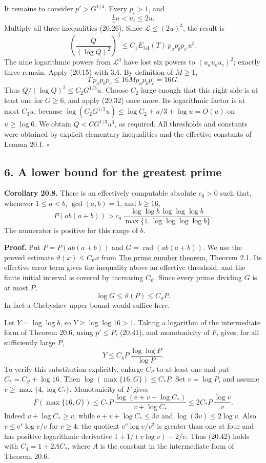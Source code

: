 \documentclass[
  11pt,
  a4paper,
]{article}
\begin{document}
It remains to consider \(p'>G^{1/4}\). Every \(p_i>1\), and \[
 \tfrac14u<u_i\le2u.
 \tag{20.37}
\] Multiply all three inequalities (20.26). Since
\(\mathcal L\le(2u)^3\), the result is \[
 \left(\frac Q{(\log Q)^2}\right)^3
 \le C_1 E_{3A}(T)\,p_ap_bp_c\,u^3.
 \tag{20.38}
\] The nine logarithmic powers from \(\mathcal L^3\) have lost six
powers to \((u_au_bu_c)^2\); exactly three remain. Apply (20.15) with
\(3A\). By definition of \(M\ge1\), \[
 T\,p_ap_bp_c
 \le16M p_ap_bp_c=16G.
 \tag{20.39}
\] Thus \(Q/(\log Q)^2\le C_2G^{1/3}u\). Choose \(C_2\) large enough
that this right side is at least one for \(G\ge6\), and apply (20.32)
once more. Its logarithmic factor is at most \(C_3u\), because
\(\log(C_2G^{1/3}u)\le\log C_2+u/3+\log u=O(u)\) on \(u\ge\log6\). We
obtain \(Q<C G^{1/3}u^3\), as required. All thresholds and constants
were obtained by explicit elementary inequalities and the effective
constants of Lemma 20.1. \(\square\)

\subsection{6. A lower bound for the greatest
prime}\label{a-lower-bound-for-the-greatest-prime}

\textbf{Corollary 20.8.} There is an effectively computable absolute
\(c_0>0\) such that, whenever \(1\le a<b\), \(\gcd(a,b)=1\), and
\(b\ge16\), \[
 P(ab(a+b))>
 c_0\,\frac{\log\log b\,\log\log\log b}
                 {\max\{1,\log\log\log\log b\}}.
 \tag{20.40}
\] The numerator is positive for this range of \(b\).

\textbf{Proof.} Put \(P=P(ab(a+b))\) and
\(G=\operatorname{rad}(ab(a+b))\). We use the proved estimate
\(\vartheta(x)\le C_\vartheta x\) from
\href{https://kokunoyumeto.github.io/open-math-courses-public/courses/NT-ZETA/NT-ZETA-12.html}{The prime number theorem}, Theorem
2.1. Its effective error term gives the inequality above an effective
threshold, and the finite initial interval is covered by increasing
\(C_\vartheta\). Since every prime dividing \(G\) is at most \(P\), \[
 \log G\le\vartheta(P)\le C_\vartheta P.
 \tag{20.41}
\] In fact a Chebyshev upper bound would suffice here.

Let \(Y=\log\log b\), so \(Y\ge\log\log16>1\). Taking a logarithm of the
intermediate form of Theorem 20.6, using \(p'\le P\), (20.41), and
monotonicity of \(F\), gives, for all sufficiently large \(P\), \[
 Y\le C_4 P\,\frac{\log\log P}{\log P}.
 \tag{20.42}
\] To verify this substitution explicitly, enlarge \(C_\vartheta\) to at
least one and put \(C_* = C_\vartheta+\log16\). Then
\(\log(\max\{16,G\})\le C_*P\). Set \(v=\log P\), and assume
\(v\ge\max\{4,\log C_*\}\). Monotonicity of \(F\) gives \[
 F(\max\{16,G\})\le
 C_*P\,\frac{\log(\mathrm e+v+\log C_*)}{v+\log C_*}
 \le 2C_*P\,\frac{\log v}{v}.
 \] Indeed \(v+\log C_*\ge v\), while \(\mathrm e+v+\log C_*\le3v\) and
\(\log(3v)\le2\log v\). Also \(v\le\mathrm e^v\log v/v\) for \(v\ge4\):
the quotient \(\mathrm e^v\log v/v^2\) is greater than one at four and
has positive logarithmic derivative \(1+1/(v\log v)-2/v\). Thus (20.42)
holds with \(C_4=1+2AC_*\), where \(A\) is the constant in the
intermediate form of Theorem 20.6.
\end{document}
